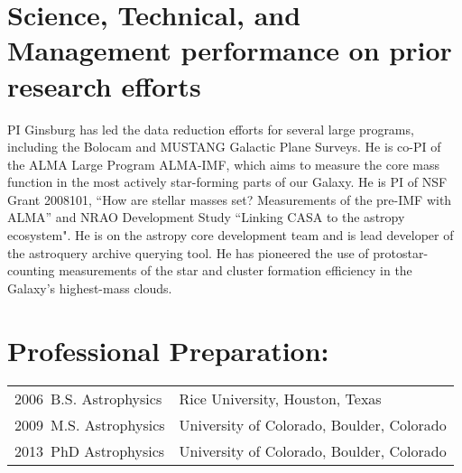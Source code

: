 \documentclass[12pt]{article}
\begin{document}





\section{Science, Technical, and Management performance on prior research efforts}
PI Ginsburg has led the data reduction efforts for several large programs, including
the Bolocam and MUSTANG Galactic Plane Surveys.  He is co-PI of the ALMA Large Program
ALMA-IMF, which aims to measure the core mass function in the most actively star-forming
parts of our Galaxy.
He is PI of NSF Grant 2008101, ``How are stellar masses set? Measurements of the pre-IMF with ALMA''
and NRAO Development Study ``Linking CASA to the astropy ecosystem".
He is on the astropy core development team and is lead developer of the astroquery
archive querying tool.  
He has pioneered the use of protostar-counting measurements of the star and cluster
formation efficiency in the Galaxy's highest-mass clouds.

\section{Professional Preparation: }
\begin{tabular} {ll}
    2006~B.S. Astrophysics & Rice University, Houston, Texas \\
    2009~M.S. Astrophysics & University of Colorado, Boulder, Colorado \\
    2013~PhD Astrophysics & University of Colorado, Boulder, Colorado \\
\end{tabular}




\setlength{\extrarowheight}{2pt}
\end{document}

